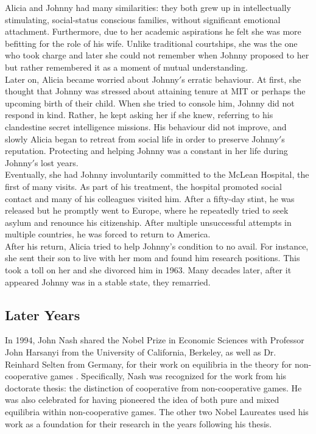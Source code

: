 \documentclass[12pt]{article}
\begin{document}
Alicia and Johnny had many similarities: they both grew up in intellectually stimulating, social-status conscious families, without significant emotional attachment. Furthermore, due to her academic aspirations he felt she was more befitting for the role of his wife. Unlike traditional courtships, she was the one who took charge and later she could not remember when Johnny proposed to her but rather remembered it as a moment of mutual understanding.\\

Later on, Alicia became worried about Johnny$'$s erratic behaviour. At first, she thought that Johnny was stressed about attaining tenure at MIT or perhaps the upcoming birth of their child. When she tried to console him, Johnny did not respond in kind. Rather, he kept asking her if she knew, referring to his clandestine secret intelligence missions. His behaviour did not improve, and slowly Alicia began to retreat from social life in order to preserve Johnny$'$s reputation. Protecting and helping Johnny was a constant in her life during Johnny$'$s lost years.\\

Eventually, she had Johnny involuntarily committed to the McLean Hospital, the first of many visits. As part of his treatment, the hospital promoted social contact and many of his colleagues visited him. After a fifty-day stint, he was released but he promptly went to Europe, where he repeatedly tried to seek asylum and renounce his citizenship. After multiple unsuccessful attempts in multiple countries, he was forced to return to America.\\

After his return, Alicia tried to help Johnny’s condition to no avail. For instance, she sent their son to live with her mom and found him research positions. This took a toll on her and she divorced him in 1963. Many decades later, after it appeared Johnny was in a stable state, they remarried.

\subsection{Later Years}

In 1994, John Nash shared the Nobel Prize in Economic Sciences with Professor John Harsanyi from the University of California, Berkeley, as well as Dr. Reinhard Selten from Germany, for their work on equilibria in the theory for non-cooperative games \cite{25}. Specifically, Nash was recognized for the work from his doctorate thesis: the distinction of cooperative from non-cooperative games. He was also celebrated for having pioneered the idea of both pure and mixed equilibria within non-cooperative games\cite{25}. The other two Nobel Laureates used his work as a foundation for their research in the years following his thesis.
\end{document}
